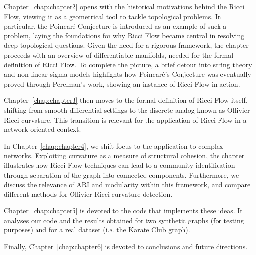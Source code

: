 Chapter~\ref{chap:chapter2} opens with the historical motivations behind the Ricci Flow, viewing it as a geometrical tool to tackle topological problems. In particular, the Poincaré Conjecture is introduced as an example of such a problem, laying the foundations for why Ricci Flow became central in resolving deep topological questions. Given the need for a rigorous framework, the chapter proceeds with an overview of differentiable manifolds, needed for the formal definition of Ricci Flow. To complete the picture, a brief detour into string theory and non-linear sigma models highlights how Poincaré's Conjecture was eventually proved through Perelman's work, showing an instance of Ricci Flow in action.

Chapter~\ref{chap:chapter3} then moves to the formal definition of Ricci Flow itself, shifting from smooth differential settings to the discrete analog known as Ollivier-Ricci curvature. This transition is relevant for the application of Ricci Flow in a network-oriented context.

In Chapter~\ref{chap:chapter4}, we shift focus to the application to complex networks. Exploiting curvature as a measure of structural cohesion, the chapter illustrates how Ricci Flow techniques can lead to a community identification through separation of the graph into connected components. Furthermore, we discuss the relevance of ARI and modularity within this framework, and compare different methods for Ollivier-Ricci curvature detection.

Chapter~\ref{chap:chapter5} is devoted to the code that implements these ideas. It analyses our code and the results obtained for two synthetic graphs (for testing purposes) and for a real dataset (i.e. the Karate Club graph).

Finally, Chapter~\ref{chap:chapter6} is devoted to conclusions and future directions.
